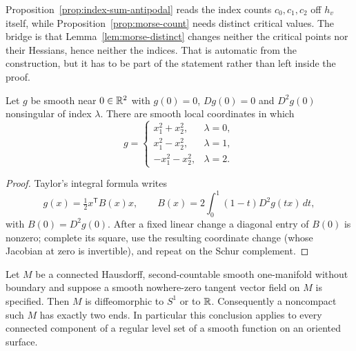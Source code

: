 \begin{fnote}\label{fnote:morse-hessian}
Proposition~\ref{prop:index-sum-antipodal} reads the index counts
$c_0,c_1,c_2$ off $h_v$ itself, while
Proposition~\ref{prop:morse-count} needs distinct critical values.  The bridge
is that Lemma~\ref{lem:morse-distinct} changes neither the critical points nor
their Hessians, hence neither the indices.  That is automatic from the
construction, but it has to be part of the statement rather than left inside
the proof.
\end{fnote}

\begin{lemma}\label{lem:morse-coords}
Let $g$ be smooth near $0\in\mathbb R^2$ with $g(0)=0$, $Dg(0)=0$ and $D^2g(0)$
nonsingular of index $\lambda$.  There are smooth local coordinates in which
\begin{equation}\label{eq:morse-normal-form}
  g=\begin{cases}
    x_1^2+x_2^2,&\lambda=0,\\
    x_1^2-x_2^2,&\lambda=1,\\
    -x_1^2-x_2^2,&\lambda=2 .
  \end{cases}
\end{equation}
\end{lemma}

\begin{proof}
Taylor's integral formula writes
\begin{equation}\label{eq:morse-B}
  g(x)=\tfrac12x^{\mathsf T}B(x)x,
  \qquad
  B(x)=2\int_0^1(1-t)D^2g(tx)\,dt ,
\end{equation}
with $B(0)=D^2g(0)$.  After a fixed linear change a diagonal entry of $B(0)$
is nonzero; complete its square, use the resulting coordinate change (whose
Jacobian at zero is invertible), and repeat on the Schur complement.
\end{proof}

\begin{lemma}
\label{lem:one-manifold}
Let $M$ be a connected Hausdorff, second-countable smooth one-manifold without
boundary and suppose a smooth nowhere-zero tangent vector field on $M$ is
specified.  Then $M$ is
diffeomorphic to $S^1$ or to $\mathbb R$.  Consequently a noncompact such $M$ has
exactly two ends.  In particular this conclusion applies to every connected
component of a regular level set of a smooth function on an oriented
surface.
\end{lemma}

